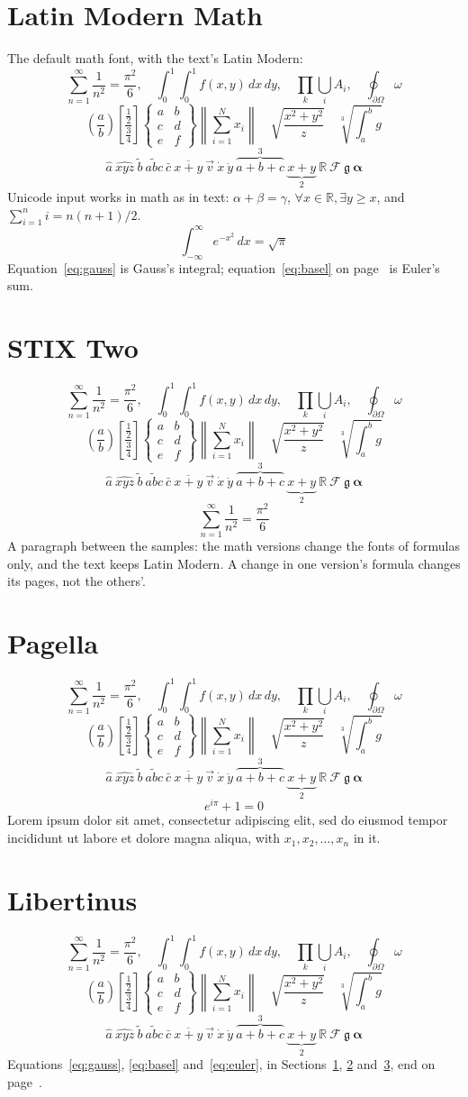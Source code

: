 \documentclass{article}
\newcommand\sample{%
\[ \sum_{n=1}^{\infty}\frac{1}{n^2}=\frac{\pi^2}{6},\quad \int_0^1\!\!\int_0^1 f(x,y)\,dx\,dy,\quad
   \prod_{k} \bigcup_{i} A_i ,\quad \oint_{\partial\Omega}\omega \]
\[ \left( \frac{a}{b} \right) \left[ \frac{\frac{1}{2}}{\frac{3}{4}} \right] \left\{ \begin{matrix} a & b \\ c & d \\ e & f \end{matrix} \right\}
   \left\| \sum_{i=1}^{N} x_i \right\| \quad \sqrt{\frac{x^2+y^2}{z}} \quad \sqrt[3]{\int_a^b g} \]
\[ \hat{a}\ \widehat{xyz}\ \tilde{b}\ \widetilde{abc}\ \bar{c}\ \overline{x+y}\ \vec{v}\ \dot{x}\ \ddot{y}\
   \overbrace{a+b+c}^{3}\ \underbrace{x+y}_{2}\ \mathbb{R}\ \mathcal{F}\ \mathfrak{g}\ \symbf{\alpha} \]}
\begin{document}
\section{Latin Modern Math}\label{sec:lm}
The default math font, with the text's Latin Modern: \sample
Unicode input works in math as in text: $α + β = γ$, $∀x ∈ ℝ, ∃y ≥ x$, and $∑_{i=1}^n i = n(n+1)/2$.
\begin{equation}\label{eq:gauss}
  \int_{-\infty}^{\infty} e^{-x^2}\,dx = \sqrt{\pi}
\end{equation}
Equation~\eqref{eq:gauss} is Gauss's integral; equation~\eqref{eq:basel} on
page~\pageref{eq:basel} is Euler's sum.

\section{STIX Two}\label{sec:stix}
{\sample
\begin{equation}\label{eq:basel}
  \sum_{n=1}^{\infty} \frac{1}{n^2} = \frac{\pi^2}{6}
\end{equation}}
A paragraph between the samples: the math versions change the fonts of formulas only,
and the text keeps Latin Modern. A change in one version's formula changes its pages,
not the others'.

\section{Pagella}\label{sec:pagella}
{\sample
\begin{equation}\label{eq:euler}
  e^{i\pi} + 1 = 0
\end{equation}}
Lorem ipsum dolor sit amet, consectetur adipiscing elit, sed do eiusmod tempor
incididunt ut labore et dolore magna aliqua, with $x_1, x_2, \dots, x_n$ in it.

\section{Libertinus}\label{sec:libertinus}
{\sample}
Equations~\eqref{eq:gauss}, \eqref{eq:basel} and~\eqref{eq:euler}, in Sections~\ref{sec:lm},
\ref{sec:stix} and~\ref{sec:pagella}, end on page~\pageref{sec:libertinus}.
\end{document}
